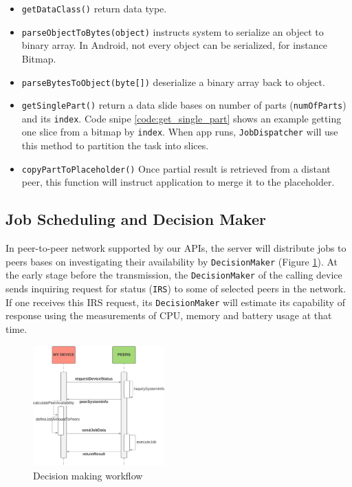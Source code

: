 \documentclass[conference]{IEEEtran}
\begin{document}
\begin{itemize}
	\item \texttt{getDataClass()} return data type.
	\item \texttt{parseObjectToBytes(object)} instructs system to serialize an object to binary array. In Android, not every object can be serialized, for instance Bitmap.  
	\item \texttt{parseBytesToObject(byte[])} deserialize a binary array back to object.
	\item \texttt{getSinglePart()} return a data slide bases on number of parts (\texttt{numOfParts}) and its \texttt{index}. Code snipe \ref{code:get_single_part} shows an example getting one slice from a bitmap by \texttt{index}. When app runs, \texttt{JobDispatcher} will use this method to partition the task into slices.
	\item \texttt{copyPartToPlaceholder()} Once partial result is retrieved from a distant peer, this function will instruct application to merge it to the placeholder.
\end{itemize}


\subsection{Job Scheduling and Decision Maker} \label{scheduling}

In peer-to-peer network supported by our APIs, the server will distribute jobs to peers bases on investigating their availability by \texttt{DecisionMaker} (Figure \ref{fig:checkStatus}). At the early stage before the transmission, the \texttt{DecisionMaker} of the calling device sends inquiring request for status (\texttt{IRS}) to some of selected peers in the network. If one receives this IRS request, its \texttt{DecisionMaker} will estimate its capability of response using the measurements of CPU, memory and battery usage at that time. 

\begin{figure}[H]
\centerline {
\includegraphics[width=0.45\textwidth, natwidth=915, natheight=837]{data/checkStatusFlow}
}
\caption{Decision making workflow}
\label{fig:checkStatus}
\end{figure}
\end{document}
